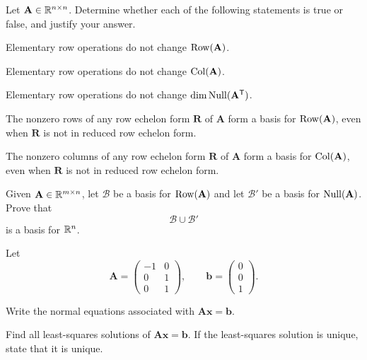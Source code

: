 \begin{problem}
Let $\mathbf A\in\mathbb{R}^{n\times n}$. Determine whether each of the following statements is true or false, and justify your answer.
\begin{problemsubparts}
\item Elementary row operations do not change $\operatorname{Row}(\mathbf A)$.
\item Elementary row operations do not change $\operatorname{Col}(\mathbf A)$.
\item Elementary row operations do not change $\dim\operatorname{Null}(\mathbf A^{\mathsf T})$.
\item The nonzero rows of any row echelon form $\mathbf R$ of $\mathbf A$ form a basis for $\operatorname{Row}(\mathbf A)$, even when $\mathbf R$ is not in reduced row echelon form.
\item The nonzero columns of any row echelon form $\mathbf R$ of $\mathbf A$ form a basis for $\operatorname{Col}(\mathbf A)$, even when $\mathbf R$ is not in reduced row echelon form.
\end{problemsubparts}
\end{problem}

\begin{problem}
Given $\mathbf A\in\mathbb{R}^{m\times n}$, let $\mathcal B$ be a basis for $\operatorname{Row}(\mathbf A)$ and let $\mathcal B'$ be a basis for $\operatorname{Null}(\mathbf A)$. Prove that
\[
\mathcal B\cup\mathcal B'
\]
is a basis for $\mathbb{R}^n$.
\end{problem}

\begin{problem}
Let
\[
\mathbf A=
\begin{pmatrix}
-1&0\\
0&1\\
0&1
\end{pmatrix},
\qquad
\mathbf b=
\begin{pmatrix}
0\\0\\1
\end{pmatrix}.
\]
\begin{problemsubparts}
\item Write the normal equations associated with $\mathbf A\mathbf x=\mathbf b$.
\item Find all least-squares solutions of $\mathbf A\mathbf x=\mathbf b$. If the least-squares solution is unique, state that it is unique.
\end{problemsubparts}
\end{problem}

